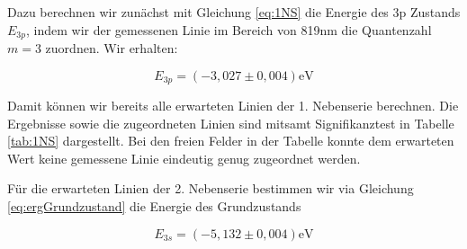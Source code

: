 \documentclass{article}
\begin{document}
Dazu berechnen wir zunächst mit Gleichung \ref{eq:1NS} die Energie des 3p Zustands $E_{3p}$, indem wir der gemessenen Linie im Bereich von 819nm die Quantenzahl $m = 3$ zuordnen. Wir erhalten:

\begin{equation}
    E_{3p} = (-3,027 \pm 0,004) \text{eV}
\end{equation}

Damit können wir bereits alle erwarteten Linien der 1. Nebenserie berechnen. Die Ergebnisse sowie die zugeordneten Linien sind mitsamt Signifikanztest in Tabelle \ref{tab:1NS} dargestellt. Bei den freien Felder in der Tabelle konnte dem erwarteten Wert keine gemessene Linie eindeutig genug zugeordnet werden.

\phantom{.}

\begin{table}[!h]
    \centering
    \caption{Zugeornete Linien der 1. Nebenserie}
    \label{tab:1NS}
\end{table}

\phantom{.}

Für die erwarteten Linien der 2. Nebenserie bestimmen wir via Gleichung \ref{eq:ergGrundzustand} die Energie des Grundzustands

\begin{equation}
    E_{3s} = (-5,132 \pm 0,004) \text{eV}
\end{equation}
\end{document}
